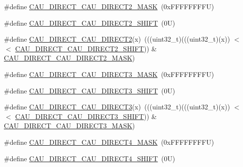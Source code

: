 \begin{DoxyCompactItemize}
\#define \mbox{\hyperlink{group___c_a_u___register___masks_ga1a2d18db12abd15f6bab404f4f36ed50}{C\+A\+U\+\_\+\+D\+I\+R\+E\+C\+T\+\_\+\+C\+A\+U\+\_\+\+D\+I\+R\+E\+C\+T2\+\_\+\+M\+A\+SK}}~(0x\+F\+F\+F\+F\+F\+F\+F\+F\+U)
\item 
\#define \mbox{\hyperlink{group___c_a_u___register___masks_ga84f35cfb3852d2a827fa1ad80bfb207f}{C\+A\+U\+\_\+\+D\+I\+R\+E\+C\+T\+\_\+\+C\+A\+U\+\_\+\+D\+I\+R\+E\+C\+T2\+\_\+\+S\+H\+I\+FT}}~(0\+U)
\item 
\#define \mbox{\hyperlink{group___c_a_u___register___masks_gaa84f31257ab678ef4963956c651a5d0d}{C\+A\+U\+\_\+\+D\+I\+R\+E\+C\+T\+\_\+\+C\+A\+U\+\_\+\+D\+I\+R\+E\+C\+T2}}(x)~(((uint32\+\_\+t)(((uint32\+\_\+t)(x)) $<$$<$ \mbox{\hyperlink{group___c_a_u___register___masks_ga84f35cfb3852d2a827fa1ad80bfb207f}{C\+A\+U\+\_\+\+D\+I\+R\+E\+C\+T\+\_\+\+C\+A\+U\+\_\+\+D\+I\+R\+E\+C\+T2\+\_\+\+S\+H\+I\+FT}})) \& \mbox{\hyperlink{group___c_a_u___register___masks_ga1a2d18db12abd15f6bab404f4f36ed50}{C\+A\+U\+\_\+\+D\+I\+R\+E\+C\+T\+\_\+\+C\+A\+U\+\_\+\+D\+I\+R\+E\+C\+T2\+\_\+\+M\+A\+SK}})
\item 
\#define \mbox{\hyperlink{group___c_a_u___register___masks_ga510182cd7a5c184e092fae143ab6b4cd}{C\+A\+U\+\_\+\+D\+I\+R\+E\+C\+T\+\_\+\+C\+A\+U\+\_\+\+D\+I\+R\+E\+C\+T3\+\_\+\+M\+A\+SK}}~(0x\+F\+F\+F\+F\+F\+F\+F\+F\+U)
\item 
\#define \mbox{\hyperlink{group___c_a_u___register___masks_ga0a9ed1b0b2d909b4c11c6591d4c8425c}{C\+A\+U\+\_\+\+D\+I\+R\+E\+C\+T\+\_\+\+C\+A\+U\+\_\+\+D\+I\+R\+E\+C\+T3\+\_\+\+S\+H\+I\+FT}}~(0\+U)
\item 
\#define \mbox{\hyperlink{group___c_a_u___register___masks_gabcf7cce02f44a12d83b0b796ce992859}{C\+A\+U\+\_\+\+D\+I\+R\+E\+C\+T\+\_\+\+C\+A\+U\+\_\+\+D\+I\+R\+E\+C\+T3}}(x)~(((uint32\+\_\+t)(((uint32\+\_\+t)(x)) $<$$<$ \mbox{\hyperlink{group___c_a_u___register___masks_ga0a9ed1b0b2d909b4c11c6591d4c8425c}{C\+A\+U\+\_\+\+D\+I\+R\+E\+C\+T\+\_\+\+C\+A\+U\+\_\+\+D\+I\+R\+E\+C\+T3\+\_\+\+S\+H\+I\+FT}})) \& \mbox{\hyperlink{group___c_a_u___register___masks_ga510182cd7a5c184e092fae143ab6b4cd}{C\+A\+U\+\_\+\+D\+I\+R\+E\+C\+T\+\_\+\+C\+A\+U\+\_\+\+D\+I\+R\+E\+C\+T3\+\_\+\+M\+A\+SK}})
\item 
\#define \mbox{\hyperlink{group___c_a_u___register___masks_gae8d866b4ec3bf7cad4a7983517e615b7}{C\+A\+U\+\_\+\+D\+I\+R\+E\+C\+T\+\_\+\+C\+A\+U\+\_\+\+D\+I\+R\+E\+C\+T4\+\_\+\+M\+A\+SK}}~(0x\+F\+F\+F\+F\+F\+F\+F\+F\+U)
\item 
\#define \mbox{\hyperlink{group___c_a_u___register___masks_ga14860fd31f4e7f9792da121883d992d9}{C\+A\+U\+\_\+\+D\+I\+R\+E\+C\+T\+\_\+\+C\+A\+U\+\_\+\+D\+I\+R\+E\+C\+T4\+\_\+\+S\+H\+I\+FT}}~(0\+U)

\end{DoxyCompactItemize}
